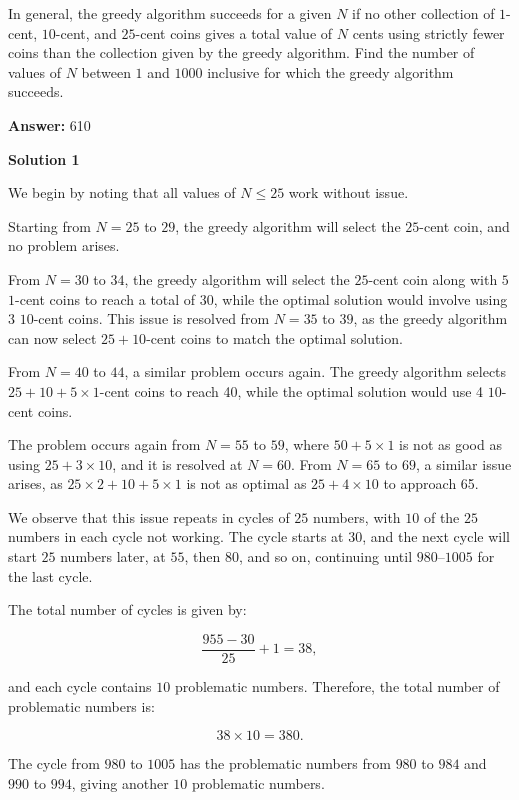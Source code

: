 \begin{enumerate}
 In general, the greedy algorithm succeeds for a given $N$ if no other collection of $1$-cent, $10$-cent, and $25$-cent coins gives a total value of $N$ cents using strictly fewer coins than the collection given by the greedy algorithm. Find the number of values of $N$ between $1$ and $1000$ inclusive for which the greedy algorithm succeeds.


 
 \textbf{Answer: }610



\textbf{Solution 1}

We begin by noting that all values of $N \leq 25$ work without issue.

 Starting from $N = 25$ to $29$, the greedy algorithm will select the $25$-cent coin, and no problem arises.

 From $N = 30$ to $34$, the greedy algorithm will select the $25$-cent coin along with $5$ $1$-cent coins to reach a total of $30$, while the optimal solution would involve using $3$ $10$-cent coins. This issue is resolved from $N = 35$ to $39$, as the greedy algorithm can now select $25 + 10$-cent coins to match the optimal solution.

 From $N = 40$ to $44$, a similar problem occurs again. The greedy algorithm selects $25 + 10 + 5 \times 1$-cent coins to reach 40, while the optimal solution would use 4 $10$-cent coins.

 The problem occurs again from $N = 55$ to $59$, where $50 + 5 \times 1$ is not as good as using $25 + 3 \times 10$, and it is resolved at $N = 60$. From $N = 65$ to $69$, a similar issue arises, as $25 \times 2 + 10 + 5 \times 1$ is not as optimal as $25 + 4 \times 10$ to approach 65.

 We observe that this issue repeats in cycles of $25$ numbers, with $10$ of the $25$ numbers in each cycle not working. The cycle starts at $30$, and the next cycle will start $25$ numbers later, at $55$, then $80$, and so on, continuing until $980$–$1005$ for the last cycle.

 The total number of cycles is given by:

 
 \[\frac{955 - 30}{25} + 1 = 38,\]

 and each cycle contains $10$ problematic numbers. Therefore, the total number of problematic numbers is:

 
 \[38 \times 10 = 380.\]

 The cycle from $980$ to $1005$ has the problematic numbers from $980$ to $984$ and $990$ to $994$, giving another $10$ problematic numbers.


\end{enumerate}
